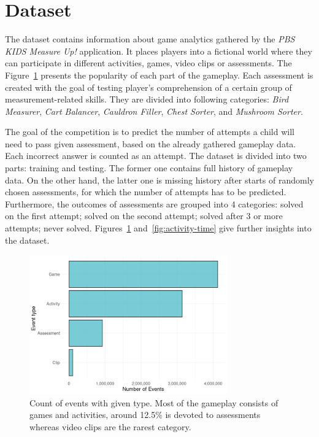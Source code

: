 \documentclass[fleqn,10pt]{SelfArx} %
\begin{document}

\section{Dataset}

The dataset contains information about game analytics gathered by the \textit{PBS KIDS Measure Up!} application.
It places players into a fictional world where they can participate in different activities, games, video clips or assessments.
The Figure~\ref{fig:event-type-counts} presents the popularity of each part of the gameplay.
Each assessment is created with the goal of testing player's comprehension of a certain group of measurement-related skills.
They are divided into following categories: \textit{Bird Measurer}, \textit{Cart Balancer}, \textit{Cauldron Filler}, \textit{Chest Sorter}, and \textit{Mushroom Sorter}.

The goal of the competition is to predict the number of attempts a child will need to pass given assessment, based on the already gathered gameplay data.
Each incorrect answer is counted as an attempt.
The dataset is divided into two parts: training and testing.
The former one contains full history of gameplay data.
On the other hand, the latter one is missing history after starts of randomly chosen assessments, for which the number of attempts has to be predicted.
Furthermore, the outcomes of assessments are grouped into 4 categories: solved on the first attempt; solved on the second attempt; solved after 3 or more attempts; never solved.
Figures~\ref{fig:event-type-counts} and~\ref{fig:activity-time} give further insights into the dataset.

\begin{figure}
    \centering
    \includegraphics[width=\linewidth,height=6cm]{images/event-type-count.png}
    \caption{Count of events with given type. Most of the gameplay consists of games and activities, around 12.5\% is devoted to assessments whereas video clips are the rarest category.}
    \label{fig:event-type-counts}
\end{figure}
\end{document}
